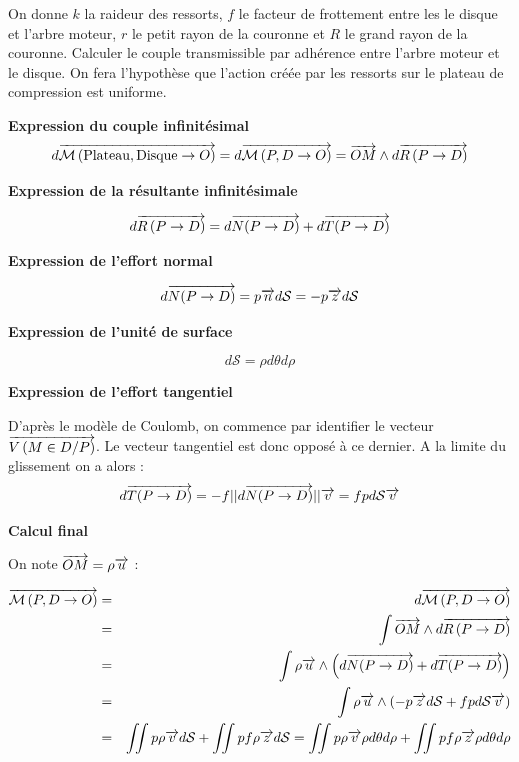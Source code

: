 \documentclass[10pt]{article}
\begin{document}
\begin{exemple}
On donne $k$ la raideur des ressorts, $f$ le facteur de frottement entre les le disque et l'arbre moteur, $r$ le petit rayon de la couronne et $R$ le grand rayon de la couronne. Calculer le couple transmissible par adhérence entre l'arbre moteur et le disque. On fera l'hypothèse que l'action créée par les ressorts sur le plateau de compression est uniforme. 

\textbf{Expression du couple infinitésimal}
$$
d\overrightarrow{\mathcal{M}\left( {\text{Plateau}}, {\text{Disque}} \rightarrow {O}\right)} =
d\overrightarrow{\mathcal{M}\left( {P}, {D} \rightarrow {O}\right)} =  \overrightarrow{OM}\wedge d\overrightarrow{R\left( {P} \rightarrow {D}\right)}
$$

\textbf{Expression de la résultante infinitésimale}

$$
d\overrightarrow{R\left( {P} \rightarrow {D}\right)} = d\overrightarrow{N(P\rightarrow D)}+d\overrightarrow{T(P\rightarrow D)}
$$

\textbf{Expression de l'effort normal}

$$
d\overrightarrow{N(P\rightarrow D)} = p \overrightarrow{n} d\mathcal{S} = -p \overrightarrow{z} d\mathcal{S}
$$

\textbf{Expression de l'unité de surface}

$$
d\mathcal{S} = \rho d\theta d\rho
$$

\textbf{Expression de l'effort tangentiel}

D'après le modèle de Coulomb, on commence par identifier le vecteur $\overrightarrow{V\left( {M} \in {D}/{P}\right)}$.
Le vecteur tangentiel est donc opposé à ce dernier. A la limite du glissement on a alors : 
$$
d\overrightarrow{T(P\rightarrow D)} = -f ||d\overrightarrow{N(P\rightarrow D)}|| \overrightarrow{v}    = fp d\mathcal{S}\overrightarrow{v}
$$

\textbf{Calcul final}

On note $\overrightarrow{OM}=\rho\overrightarrow{u}$ :

\begin{eqnarray*}
\overrightarrow{\mathcal{M}\left( {P}, {D} \rightarrow {O}\right)}  
&=& d\overrightarrow{\mathcal{M}\left( {P}, {D} \rightarrow {O}\right)}  \\
&=& \int \overrightarrow{OM}\wedge d\overrightarrow{R\left( {P} \rightarrow {D}\right)} \\
&=& \int \rho\overrightarrow{u} \wedge \left( d\overrightarrow{N(P\rightarrow D)}+d\overrightarrow{T(P\rightarrow D)} \right)\\
&=& \int \rho\overrightarrow{u} \wedge \left( -p \overrightarrow{z} d\mathcal{S} +fp d\mathcal{S}\overrightarrow{v} \right)\\
&=& \iint p\rho\overrightarrow{v} d\mathcal{S} +\iint pf\rho  \overrightarrow{z}d\mathcal{S} = 
\iint p\rho\overrightarrow{v} \rho d\theta d\rho +\iint pf\rho  \overrightarrow{z}\rho d\theta d\rho \\
\end{eqnarray*}


\end{exemple}
\end{document}
